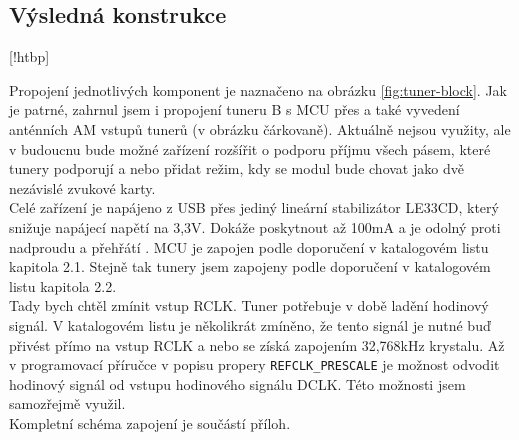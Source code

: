 \subsection{Výsledná konstrukce}
[!htbp]

Propojení jednotlivých komponent je naznačeno na obrázku \ref{fig:tuner-block}. Jak je patrné, zahrnul jsem i propojení tuneru B s MCU přes \iis a také vyvedení anténních AM vstupů tunerů (v obrázku čárkovaně). Aktuálně nejsou využity, ale v budoucnu bude možné zařízení rozšířit o podporu příjmu všech pásem, které tunery podporují a nebo přidat režim, kdy se modul bude chovat jako dvě nezávislé zvukové karty.\\
Celé zařízení je napájeno z USB přes jediný lineární stabilizátor LE33CD, který snižuje napájecí napětí na 3,3V. Dokáže poskytnout až 100mA a je odolný proti nadproudu a přehřátí \cite{le}. MCU je zapojen podle doporučení v katalogovém listu \cite{pic} kapitola 2.1. Stejně tak tunery jsem zapojeny podle doporučení v katalogovém listu \cite{tuner-datasheet} kapitola 2.2.\\
 Tady bych chtěl zmínit vstup RCLK. Tuner potřebuje v době ladění hodinový signál. V katalogovém listu je několikrát zmíněno, že tento signál je nutné buď přivést přímo na vstup RCLK a nebo se získá zapojením 32,768kHz krystalu. Až v programovací příručce \cite{tuner-programing} v popisu propery \verb|REFCLK_PRESCALE| je možnost odvodit hodinový signál od vstupu hodinového signálu \iis DCLK. Této možnosti jsem samozřejmě využil. \\
Kompletní schéma zapojení je součástí příloh.
